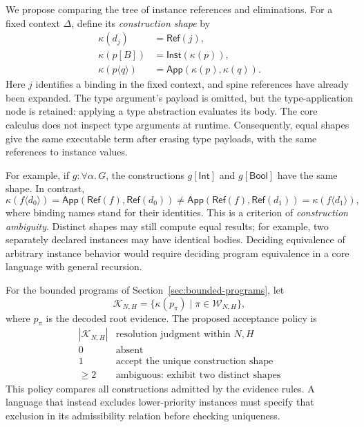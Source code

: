 \documentclass[10pt,a4paper]{article}
\newcommand{\Int}{\mathsf{Int}}
\newcommand{\Bool}{\mathsf{Bool}}
\newcommand{\iarg}[1]{\langle#1\rangle}
\newcommand{\kw}[1]{\mathsf{#1}}
\begin{document}
We propose comparing the tree of instance references and eliminations. For a
fixed context $\Delta$, define its \emph{construction shape} by
\[
\begin{aligned}
 \kappa(d_j)&=\kw{Ref}(j),\\
 \kappa(p[B])&=\kw{Inst}(\kappa(p)),\\
 \kappa(p\iarg{q})&=\kw{App}(\kappa(p),\kappa(q)).
\end{aligned}
\]
Here $j$ identifies a binding in the fixed context, and spine references have
already been expanded. The type argument's payload is omitted, but the
type-application node is retained: applying a type abstraction evaluates its
body. The core calculus does not inspect type arguments at runtime. Consequently,
equal shapes give the same executable term after erasing type payloads, with
the same references to instance values.

For example, if $g:\forall\alpha.\,G$, the constructions $g[\Int]$ and
$g[\Bool]$ have the same shape. In contrast,
\[
 \kappa(f\iarg{d_0})=\kw{App}(\kw{Ref}(f),\kw{Ref}(d_0))
 \ne\kw{App}(\kw{Ref}(f),\kw{Ref}(d_1))=\kappa(f\iarg{d_1}),
\]
where binding names stand for their identities. This is a criterion of
\emph{construction ambiguity}. Distinct shapes may still compute equal results;
for example, two separately declared instances may have identical bodies.
Deciding equivalence of arbitrary instance behavior would require deciding
program equivalence in a core language with general recursion.

For the bounded programs of Section~\ref{sec:bounded-programs}, let
\[
 \mathcal K_{N,H}
   =\{\kappa(p_\pi)\mid\pi\in\mathcal W_{N,H}\},
\]
where $p_\pi$ is the decoded root evidence. The proposed acceptance policy is
\[
\begin{array}{c|c}
 |\mathcal K_{N,H}| & \text{resolution judgment within }N,H\\ \hline
 0 & \text{absent}\\
 1 & \text{accept the unique construction shape}\\
 \ge2 & \text{ambiguous: exhibit two distinct shapes}
\end{array}
\]
This policy compares all constructions admitted by the evidence rules.
A language that instead excludes lower-priority instances must specify that
exclusion in its admissibility relation before checking uniqueness.

\newpage
\end{document}
